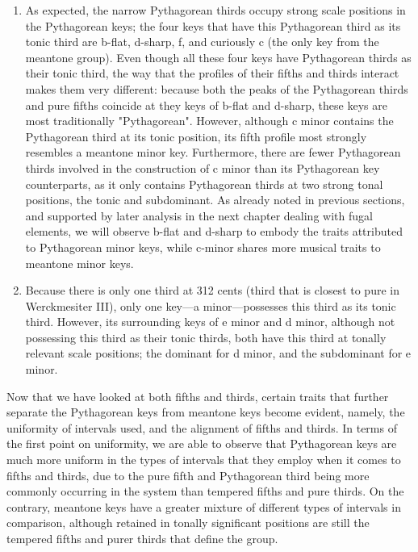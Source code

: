 \begin{enumerate}
\def\labelenumi{\arabic{enumi}.}
\tightlist
\item
  As expected, the narrow Pythagorean thirds occupy strong scale
  positions in the Pythagorean keys; the four keys that have this
  Pythagorean third as its tonic third are b-flat, d-sharp, f, and
  curiously c (the only key from the meantone group). Even though all
  these four keys have Pythagorean thirds as their tonic third, the way
  that the profiles of their fifths and thirds interact makes them very
  different: because both the peaks of the Pythagorean thirds and pure
  fifths coincide at they keys of b-flat and d-sharp, these keys are
  most traditionally "Pythagorean". However, although c minor contains
  the Pythagorean third at its tonic position, its fifth profile most
  strongly resembles a meantone minor key. Furthermore, there are fewer
  Pythagorean thirds involved in the construction of c minor than its
  Pythagorean key counterparts, as it only contains Pythagorean thirds
  at two strong tonal positions, the tonic and subdominant. As already
  noted in previous sections, and supported by later analysis in the
  next chapter dealing with fugal elements, we will observe b-flat and
  d-sharp to embody the traits attributed to Pythagorean minor keys,
  while c-minor shares more musical traits to meantone minor keys.
\item
  Because there is only one third at 312 cents (third that is closest to
  pure in Werckmesiter III), only one key---a minor---possesses
  this third as its tonic third. However, its surrounding keys of e
  minor and d minor, although not possessing this third as their tonic
  thirds, both have this third at tonally relevant scale positions; the
  dominant for d minor, and the subdominant for e minor.
\end{enumerate}

Now that we have looked at both fifths and thirds, certain traits that
further separate the Pythagorean keys from meantone keys become evident,
namely, the uniformity of intervals used, and the alignment of fifths
and thirds. In terms of the first point on uniformity, we are able to
observe that Pythagorean keys are much more uniform in the types of
intervals that they employ when it comes to fifths and thirds, due to
the pure fifth and Pythagorean third being more commonly occurring in
the system than tempered fifths and pure thirds. On the contrary,
meantone keys have a greater mixture of different types of intervals in
comparison, although retained in tonally significant positions are still
the tempered fifths and purer thirds that define the group.

